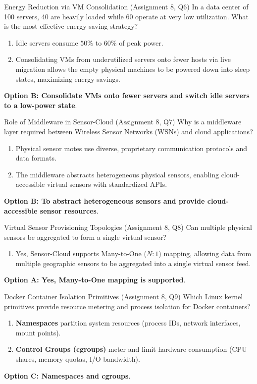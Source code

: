 \begin{solved}{Energy Reduction via VM Consolidation (Assignment 8, Q6)}
\Given In a data center of 100 servers, 40 are heavily loaded while 60 operate at very low utilization. What is the most effective energy saving strategy?
\Steps
\begin{enumerate}[leftmargin=*]
  \item Idle servers consume $50\%$ to $60\%$ of peak power.
  \item Consolidating VMs from underutilized servers onto fewer hosts via live migration allows the empty physical machines to be powered down into sleep states, maximizing energy savings.
\end{enumerate}
\Answer \textbf{Option B: Consolidate VMs onto fewer servers and switch idle servers to a low-power state}.
\end{solved}

\begin{solved}{Role of Middleware in Sensor-Cloud (Assignment 8, Q7)}
\Given Why is a middleware layer required between Wireless Sensor Networks (WSNs) and cloud applications?
\Steps
\begin{enumerate}[leftmargin=*]
  \item Physical sensor motes use diverse, proprietary communication protocols and data formats.
  \item The middleware abstracts heterogeneous physical sensors, enabling cloud-accessible virtual sensors with standardized APIs.
\end{enumerate}
\Answer \textbf{Option B: To abstract heterogeneous sensors and provide cloud-accessible sensor resources}.
\end{solved}

\begin{solved}{Virtual Sensor Provisioning Topologies (Assignment 8, Q8)}
\Given Can multiple physical sensors be aggregated to form a single virtual sensor?
\Steps
\begin{enumerate}[leftmargin=*]
  \item Yes, Sensor-Cloud supports Many-to-One ($N:1$) mapping, allowing data from multiple geographic sensors to be aggregated into a single virtual sensor feed.
\end{enumerate}
\Answer \textbf{Option A: Yes, Many-to-One mapping is supported}.
\end{solved}

\begin{solved}{Docker Container Isolation Primitives (Assignment 8, Q9)}
\Given Which Linux kernel primitives provide resource metering and process isolation for Docker containers?
\Steps
\begin{enumerate}[leftmargin=*]
  \item \textbf{Namespaces} partition system resources (process IDs, network interfaces, mount points).
  \item \textbf{Control Groups (cgroups)} meter and limit hardware consumption (CPU shares, memory quotas, I/O bandwidth).
\end{enumerate}
\Answer \textbf{Option C: Namespaces and cgroups}.
\end{solved}

